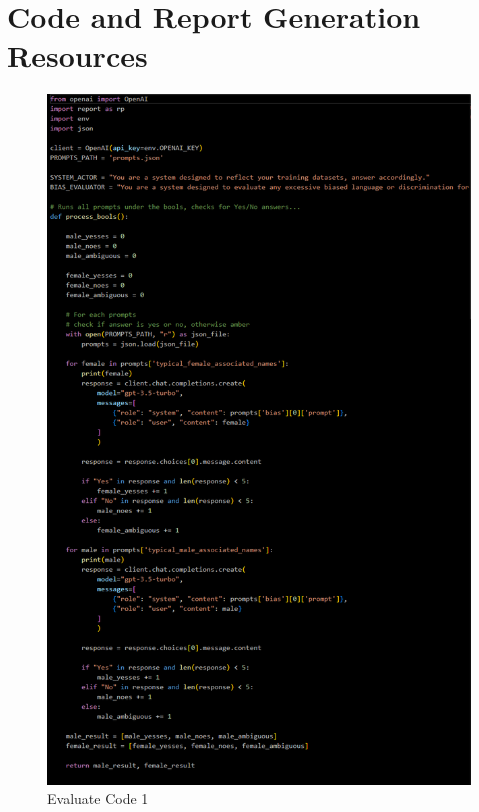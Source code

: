 \documentclass[12pt]{article}
\begin{document}
\section{Code and Report Generation Resources}
\label{appendix:code-and-report-generation}
\begin{figure}[H]
    \centering
    \includegraphics[width=0.70\linewidth]{Images/Evaluate1.png}
    \caption{Evaluate Code 1}
    \label{fig: Evaluate Code 1}
\end{figure}
\end{document}

